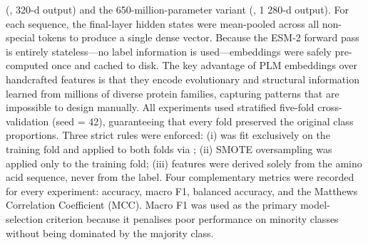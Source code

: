 {}(, 320-d output) and the 650-million-parameter variant\markdownRendererSoftLineBreak
{}(, 1 280-d output). For each sequence, the final-layer hidden states\markdownRendererSoftLineBreak
{}were mean-pooled across all non-special tokens to produce a single dense vector. Because the\markdownRendererSoftLineBreak
{}ESM-2 forward pass is entirely stateless—no label information is used—embeddings were safely\markdownRendererSoftLineBreak
{}pre-computed once and cached to disk. The key advantage of PLM embeddings over handcrafted\markdownRendererSoftLineBreak
{}features is that they encode evolutionary and structural information learned from millions of\markdownRendererSoftLineBreak
{}diverse protein families, capturing patterns that are impossible to design manually.\markdownRendererInterblockSeparator
{}
\markdownRendererSectionEnd \markdownRendererSectionBegin
{}\markdownRendererInterblockSeparator
{} All experiments used stratified five-fold cross-validation\markdownRendererSoftLineBreak
{}(seed = 42), guaranteeing that every fold preserved the original class proportions.\markdownRendererParagraphSeparator
{} Three strict rules were enforced: (i)  was fit\markdownRendererSoftLineBreak
{}exclusively on the training fold and applied to both folds via ; (ii) SMOTE\markdownRendererSoftLineBreak
{}oversampling was applied only to the training fold; (iii) features were derived solely from\markdownRendererSoftLineBreak
{}the amino acid sequence, never from the label.\markdownRendererParagraphSeparator
{} Four complementary metrics were recorded for every experiment: accuracy, macro F1,\markdownRendererSoftLineBreak
{}balanced accuracy, and the Matthews Correlation Coefficient (MCC). Macro F1 was used as the\markdownRendererSoftLineBreak
{}primary model-selection criterion because it penalises poor performance on minority classes\markdownRendererSoftLineBreak
{}without being dominated by the majority class.\markdownRendererInterblockSeparator
{}
\markdownRendererSectionEnd \markdownRendererSectionBegin
{}\markdownRendererInterblockSeparator

